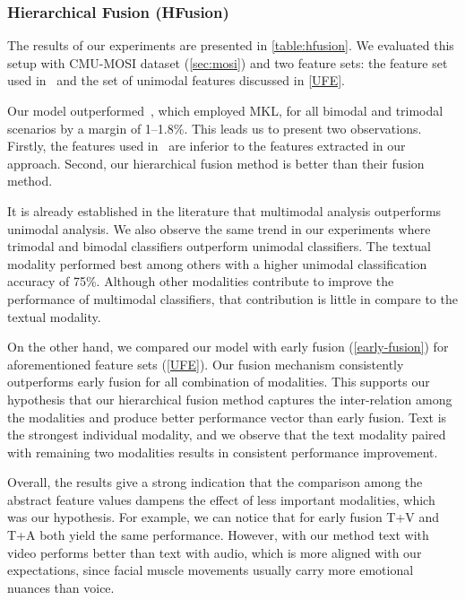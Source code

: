 \documentclass[review]{elsarticle}
\newcommand\?[1]{\hl{#1}}
\begin{document}
\subsubsection{Hierarchical Fusion (HFusion)}
\label{hfusion}

The results of our experiments are presented in \cref{table:hfusion}. We
evaluated this setup with CMU-MOSI dataset (\cref{sec:mosi}) and two
feature sets: the feature set used in~\citep{pordee}
and the set of unimodal features discussed in \cref{UFE}.

Our model outperformed~\citep{pordee}, which employed MKL, for all bimodal
and trimodal scenarios by a margin of 1--1.8\%. This leads us to present two
observations. Firstly, the features used in~\citep{pordee} are inferior to
the features extracted in our approach. Second, our hierarchical
fusion method is better than their fusion method.

It is already established in the literature
\citep{pordee,perez2013utterance} that multimodal analysis outperforms
unimodal analysis. We also observe the same trend in our experiments where
trimodal and bimodal classifiers outperform unimodal classifiers. The textual
modality performed best among others with a higher unimodal classification
accuracy of 75\%. Although other modalities contribute to improve the
performance of multimodal classifiers, that contribution is little in compare to
the textual modality.

On the other hand, we compared our model with early fusion
(\cref{early-fusion}) for aforementioned feature sets
(\cref{UFE}). Our fusion mechanism consistently outperforms early fusion for
all combination of modalities. This supports our
hypothesis that our hierarchical fusion method captures the
inter-relation among the modalities and produce better performance vector than
early fusion. Text is the strongest individual modality, and we observe that
the text modality paired with remaining two modalities results in consistent
performance improvement.

Overall, the results give a strong indication that the comparison among the
abstract feature values dampens the effect of less important modalities, which
was our hypothesis. For example, we can notice that for early fusion T+V and T+A
both yield the same performance. However, with our method text with video
performs better than text with audio, which is more aligned with our
expectations, since facial muscle movements usually carry more emotional nuances
than voice.
\end{document}
